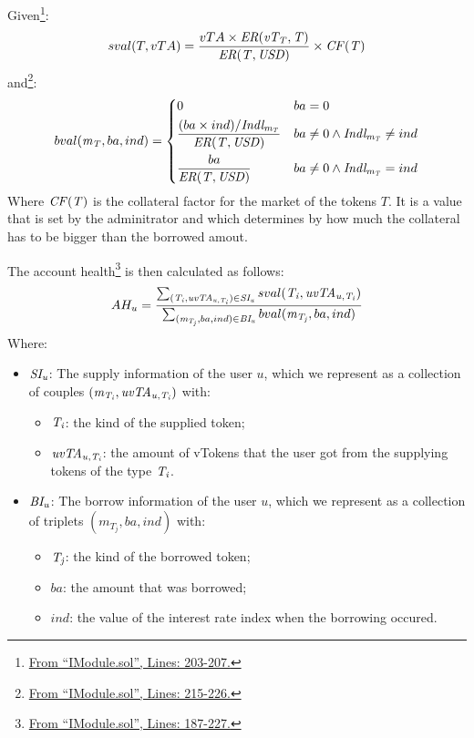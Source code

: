 \noindent Given\footnote{\href{https://github.com/SVOIcom/everscalend-contracts/blob/8d24e268f9c44bd3e896fb6a28bbf8a42c7027a9/smart-contracts/src/ModulesForMarket/interfaces/IModule.sol\#L203-L207}{From ``IModule.sol'', Lines: 203-207.}}:
$$
  sval(T, vTA) = \frac{vTA \times \mathit{ER(\mathit{vT_{T}}, T)}}{\mathit{ER(T, \mathit{USD})}} \times \mathit{CF(T)}
$$
and\footnote{\href{https://github.dev/SVOIcom/everscalend-contracts/blob/8d24e268f9c44bd3e896fb6a28bbf8a42c7027a9/smart-contracts/src/ModulesForMarket/interfaces/IModule.sol\#L215-L226}{From ``IModule.sol'', Lines: 215-226.}}:
$$
  bval(\mathit{m_{T}}, ba, ind) =\begin{dcases}
    0 & ba = 0\\
    \frac{(ba \times ind)/ \mathit{Indl_{\mathit{m_{T}}}}}{\mathit{ER(T, \mathit{USD})}} & ba \neq 0 \wedge \mathit{Indl_{\mathit{m_{T}}}} \neq ind \\
    \frac{ba}{\mathit{ER(T, \mathit{USD})}} & ba \neq 0 \wedge \mathit{Indl_{\mathit{m_{T}}}} = ind
    \end{dcases}
$$
Where $\mathit{CF(T)}$ is the collateral factor for the market of the tokens $T$. It is a value that is set by the adminitrator and which determines by how much the collateral has to be bigger than the borrowed amout.

The account health\footnote{\href{https://github.com/SVOIcom/everscalend-contracts/blob/8d24e268f9c44bd3e896fb6a28bbf8a42c7027a9/smart-contracts/src/ModulesForMarket/interfaces/IModule.sol\#L187-L227}{From ``IModule.sol'', Lines: 187-227.}} is then calculated as follows:
$$
  AH_u =
    \frac {
      \sum_{(\mathit{T_{i}}, \mathit{uvTA_{u, \mathit{T_{i}}}}) \in \mathit{SI_{u}}}
        sval(\mathit{T_{i}}, \mathit{uvTA_{u, \mathit{T_{i}}}})
    } {
      \sum_{(\mathit{m_{\mathit{T_{j}}}}, ba, ind) \in \mathit{BI_{u}}}
      bval(\mathit{m_{\mathit{T_{j}}}}, ba, ind)
    }
$$
Where:
\begin{itemize}
  \item $\mathit{SI_{u}}$: The supply information of the user $u$, which we represent as a collection of couples $(\mathit{m_{\mathit{T_{i}}}}, \mathit{uvTA_{u, \mathit{T_{i}}}})$ with:
  \begin{itemize}
    \item $\mathit{T_{i}}$: the kind of the supplied token;
    \item $\mathit{uvTA_{u, \mathit{T_{i}}}}$: the amount of vTokens that the user got from the supplying tokens of the type $\mathit{T_{i}}$.
  \end{itemize}
  \item $\mathit{BI_{u}}$: The borrow information of the user $u$, which we represent as a collection of triplets $(m_{T_j}, ba, ind)$ with:
  \begin{itemize}
    \item $\mathit{T_{j}}$: the kind of the borrowed token;
    \item $ba$: the amount that was borrowed;
    \item $ind$: the value of the interest rate index when the borrowing occured.
  \end{itemize}
\end{itemize}

